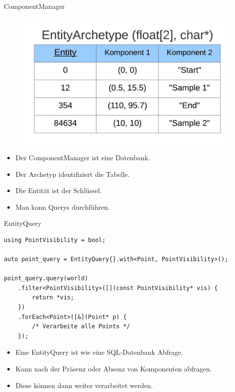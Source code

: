 \documentclass{presentation}
\begin{document}
\begin{frame}{ComponentManager}
    \begin{figure}
        \includegraphics[scale=0.6]{entity_table.jpg}
    \end{figure}

    \begin{itemize}
        \item Der ComponentManager ist eine Datenbank.
        \item Der Archetyp identifiziert die Tabelle.
        \item Die Entität ist der Schlüssel.
        \item Man kann Querys durchführen.
    \end{itemize}
\end{frame}


\begin{frame}[fragile]{EntityQuery}
    \begin{lstlisting}[style=context]
using PointVisibility = bool;

auto point_query = EntityQuery{}.with<Point, PointVisibility>();

point_query.query(world)
    .filter<PointVisibility>([](const PointVisibility* vis) {
        return *vis;
    })
    .forEach<Point>([&](Point* p) {
        /* Verarbeite alle Points */
    });
    \end{lstlisting}

    \begin{itemize}
        \item Eine EntityQuery ist wie eine SQL-Datenbank Abfrage.
        \item Kann nach der Präsenz oder Absenz von Komponenten abfragen.
        \item Diese können dann weiter verarbeitet werden.
    \end{itemize}
\end{frame}
\end{document}
